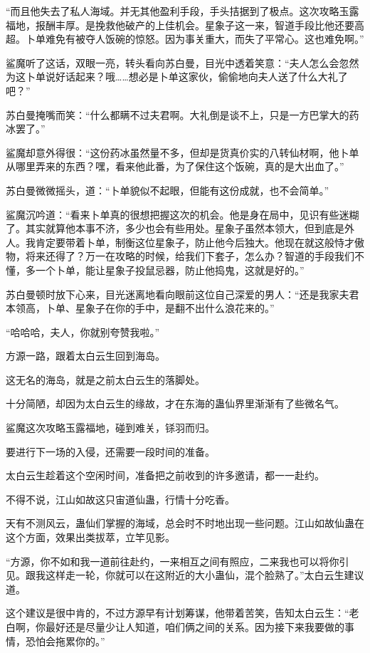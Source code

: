 \begin{this_body}
“而且他失去了私人海域。并无其他盈利手段，手头拮据到了极点。这次攻略玉露福地，报酬丰厚。是挽救他破产的上佳机会。星象子这一来，智道手段比他还要高超。卜单难免有被夺人饭碗的惊怒。因为事关重大，而失了平常心。这也难免啊。”

鲨魔听了这话，双眼一亮，转头看向苏白曼，目光中透着笑意：“夫人怎么会忽然为这卜单说好话起来？哦……想必是卜单这家伙，偷偷地向夫人送了什么大礼了吧？”

苏白曼掩嘴而笑：“什么都瞒不过夫君啊。大礼倒是谈不上，只是一方巴掌大的药冰罢了。”

鲨魔却意外得很：“这份药冰虽然量不多，但却是货真价实的八转仙材啊，他卜单从哪里弄来的东西？嘿，看来他此番，为了保住这个饭碗，真的是大出血了。”

苏白曼微微摇头，道：“卜单貌似不起眼，但能有这份成就，也不会简单。”

鲨魔沉吟道：“看来卜单真的很想把握这次的机会。他是身在局中，见识有些迷糊了。其实就算他本事不济，多少也会有些用处。星象子虽然本领大，但到底是外人。我肯定要带着卜单，制衡这位星象子，防止他今后独大。他现在就这般恃才傲物，将来还得了？万一在攻略的时候，给我们下套子，怎么办？智道的手段我们不懂，多一个卜单，能让星象子投鼠忌器，防止他捣鬼，这就是好的。”

苏白曼顿时放下心来，目光迷离地看向眼前这位自己深爱的男人：“还是我家夫君本领高，卜单、星象子在你的手中，是翻不出什么浪花来的。”

“哈哈哈，夫人，你就别夸赞我啦。”

方源一路，跟着太白云生回到海岛。

这无名的海岛，就是之前太白云生的落脚处。

十分简陋，却因为太白云生的缘故，才在东海的蛊仙界里渐渐有了些微名气。

鲨魔这次攻略玉露福地，碰到难关，铩羽而归。

要进行下一场的入侵，还需要一段时间的准备。

太白云生趁着这个空闲时间，准备把之前收到的许多邀请，都一一赴约。

不得不说，江山如故这只宙道仙蛊，行情十分吃香。

天有不测风云，蛊仙们掌握的海域，总会时不时地出现一些问题。江山如故仙蛊在这个方面，效果出类拔萃，立竿见影。

“方源，你不如和我一道前往赴约，一来相互之间有照应，二来我也可以将你引见。跟我这样走一轮，你就可以在这附近的大小蛊仙，混个脸熟了。”太白云生建议道。

这个建议是很中肯的，不过方源早有计划筹谋，他带着苦笑，告知太白云生：“老白啊，你最好还是尽量少让人知道，咱们俩之间的关系。因为接下来我要做的事情，恐怕会拖累你的。”


\end{this_body}
